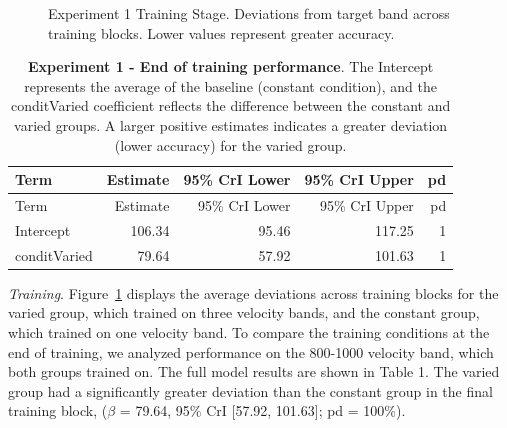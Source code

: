 \documentclass[
  12pt,
  letterpaper,
]{article}
\begin{document}
\begin{figure}


\caption{\label{fig-e1-train-dev}Experiment 1 Training Stage. Deviations
from target band across training blocks. Lower values represent greater
accuracy.}

\end{figure}%

\begin{longtable}[]{@{}lrrrr@{}}
\caption{\textbf{Experiment 1 - End of training performance}. The
Intercept represents the average of the baseline (constant condition),
and the conditVaried coefficient reflects the difference between the
constant and varied groups. A larger positive estimates indicates a
greater deviation (lower accuracy) for the varied
group.}\label{tbl-e1-train-dist}\tabularnewline
\toprule\noalign{}
Term & Estimate & 95\% CrI Lower & 95\% CrI Upper & pd \\
\midrule\noalign{}
\endfirsthead
\toprule\noalign{}
Term & Estimate & 95\% CrI Lower & 95\% CrI Upper & pd \\
\midrule\noalign{}
\endhead
\bottomrule\noalign{}
\endlastfoot
Intercept & 106.34 & 95.46 & 117.25 & 1 \\
conditVaried & 79.64 & 57.92 & 101.63 & 1 \\
\end{longtable}

\hfill\break

\emph{Training}. Figure~\ref{fig-e1-train-dev} displays the average
deviations across training blocks for the varied group, which trained on
three velocity bands, and the constant group, which trained on one
velocity band. To compare the training conditions at the end of
training, we analyzed performance on the 800-1000 velocity band, which
both groups trained on. The full model results are shown in Table 1. The
varied group had a significantly greater deviation than the constant
group in the final training block, (\(\beta\) = 79.64, 95\% CrI
{[}57.92, 101.63{]}; pd = 100\%).
\end{document}
